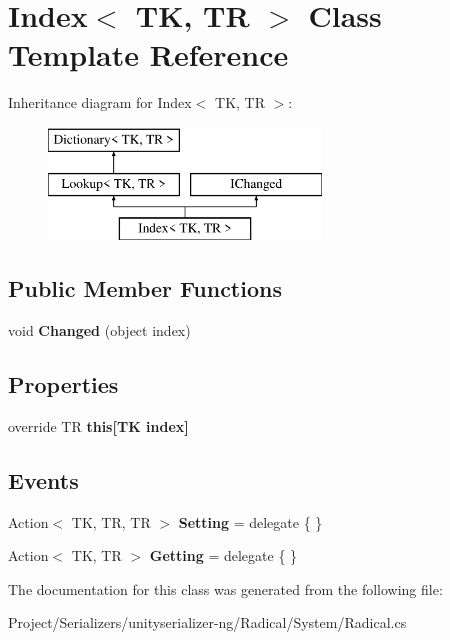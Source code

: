 \hypertarget{class_index}{}\section{Index$<$ TK, TR $>$ Class Template Reference}
\label{class_index}
Inheritance diagram for Index$<$ TK, TR $>$\+:\begin{figure}[H]
\begin{center}
\leavevmode
\includegraphics[height=3.000000cm]{class_index}
\end{center}
\end{figure}
\subsection*{Public Member Functions}
\begin{DoxyCompactItemize}
\item 
\mbox{\label{class_index_a3e67374081c64d8097112ab9286bbf1b}} 
void {\bfseries Changed} (object index)
\end{DoxyCompactItemize}
\subsection*{Properties}
\begin{DoxyCompactItemize}
\item 
\mbox{\label{class_index_a55f528c0402412e4a0223895b89d559f}} 
override TR {\bfseries this\mbox{[}\+T\+K index\mbox{]}}
\end{DoxyCompactItemize}
\subsection*{Events}
\begin{DoxyCompactItemize}
\item 
\mbox{\label{class_index_aa53b2a997b85088499bc11af6ca6ddfc}} 
Action$<$ TK, TR, TR $>$ {\bfseries Setting} = delegate \{ \}
\item 
\mbox{\label{class_index_a7b5c195702db7df525a4ae4dd9f17d36}} 
Action$<$ TK, TR $>$ {\bfseries Getting} = delegate \{ \}
\end{DoxyCompactItemize}


The documentation for this class was generated from the following file\+:\begin{DoxyCompactItemize}
\item 
Project/\+Serializers/unityserializer-\/ng/\+Radical/\+System/Radical.\+cs\end{DoxyCompactItemize}

